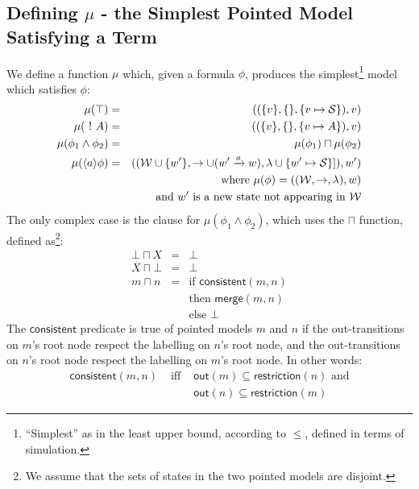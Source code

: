 \subsection{Defining $\mu$ - the Simplest Pointed Model Satisfying a Term}
We define a function $\mu$ which, given a formula $\phi$, produces the simplest\footnote{``Simplest'' as in the least upper bound, according to $\leq$, defined in terms of simulation.} model which satisfies $\phi$:
\begin{eqnarray}
\mu (\top) & = & ( (\{v\}, \{\}, \{v \mapsto \mathcal{S}\}), v) \nonumber \\
\mu (\ ! \  A) & = & ( (\{v\}, \{\}, \{v \mapsto A\}), v) \nonumber \\
\mu (\phi_1 \land \phi_2) & = & \mu(\phi_1) \sqcap \mu(\phi_2) \nonumber \\
\mu (\langle a \rangle \phi) & = & ( (\mathcal{W} \cup \{w'\}, \rightarrow \cup (w' \xrightarrow{a} w), \lambda \cup \{w' \mapsto \mathcal{S}\}]), w') \nonumber \\
		& & \mbox{where }\mu(\phi) = ( (\mathcal{W}, \rightarrow, \lambda), w) \nonumber \\
		& & \mbox{and }w' \mbox{ is a new state not appearing in }\mathcal{W} \nonumber
\end{eqnarray}
The only complex case is the clause for $\mu (\phi_1 \land \phi_2)$, which uses the $\sqcap$ function, defined as\footnote{We assume that the sets of states in the two pointed models are disjoint.}:
\begin{eqnarray}
\bot \sqcap X & = & \bot \nonumber \\
X \sqcap \bot & = & \bot \nonumber \\
m \sqcap n & = & \mbox{if } \mathsf{consistent}(m, n)\nonumber \\
	& & \mbox{then } \mathsf{merge}(m, n) \nonumber \\
	& & \mbox{else } \bot \nonumber
\end{eqnarray}
The $\mathsf{consistent}$ predicate is true of pointed models $m$ and $n$ if the out-transitions on $m$'s root node respect the labelling on $n$'s root node, and the out-transitions on $n$'s root node respect the labelling on $m$'s root node. In other words:
\begin{eqnarray}
\mathsf{consistent}(m, n) & \mbox{ iff } & \mathsf{out}(m) \subseteq \mathsf{restriction}(n) \mbox{ and} \nonumber \\
& & \mathsf{out}(n) \subseteq \mathsf{restriction}(m) \nonumber
\end{eqnarray}
